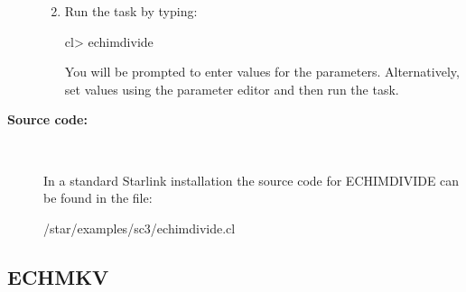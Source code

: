 \documentclass[twoside,11pt]{starlink}
\begin{document}
\begin{description}
\begin{enumerate}

\item Run the task by typing:

\begin{terminalv}
   cl> echimdivide
\end{terminalv}

      You will be prompted
      to enter values for the parameters. Alternatively, set values
      using the parameter editor and then run the task.
\end{enumerate}

\item [\textbf{Source code:}] \mbox{} \\
\begin{latexonly}
In a standard Starlink installation the source code for ECHIMDIVIDE can be
found in the file:
\begin{terminalv}
   /star/examples/sc3/echimdivide.cl
\end{terminalv}
\end{latexonly}



\end{description}

\newpage
\subsection{\label{se_echmkv}ECHMKV}
\end{document}
